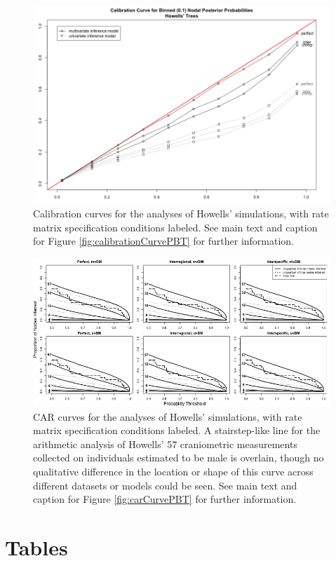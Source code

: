 \documentclass[10pt, twocolumn, twoside]{article}
\begin{document}
\begin{figure}[h]
\centering
\includegraphics[width=120mm]{figures/calibrationCurveHowells.png}
\caption[Calibration Curves for the Brownian Motion Simulation Study, Empirically Parameterized Conditions]{Calibration curves for the analyses of Howells’ simulations, with rate matrix specification conditions labeled. See main text and caption for Figure \ref{fig:calibrationCurvePBT} for further information.
\label{overflow}
\label{fig:calibrationCurveHowells}
}
\end{figure}

\begin{figure}[h]
\centering
\includegraphics[width=160mm]{figures/CARcurvesHowells_BW.png}
\caption[Cumulative Average Resolution Curves for the Brownian Motion Simulation Study, Empirically Parameterized Conditions]{CAR curves for the analyses of Howells’ simulations, with rate matrix specification conditions labeled. A stairstep-like line for the arithmetic analysis of Howells’ 57 craniometric measurements collected on individuals estimated to be male is overlain, though no qualitative difference in the location or shape of this curve across different datasets or models could be seen. See main text and caption for Figure \ref{fig:carCurvePBT} for further information.
\label{overflow}
\label{fig:carCurveHowells}
}
\end{figure}

\clearpage

\section{Tables}



\clearpage
\twocolumn

{
\footnotesize

}
\end{document}
